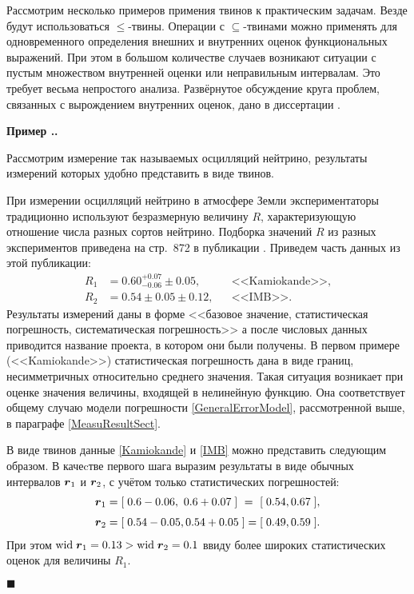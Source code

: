 \documentclass[a5paper,openany]{book}
\newcommand{\mbf}[1]{\protect\text{\boldmath$#1$}}
\newcommand{\w}{\mathrm{wid}\;}
\newcounter{ExmpNum}[section]
\renewcommand{\theExmpNum}{\thesection.\arabic{ExmpNum}}
\newenvironment{example}%
  {\refstepcounter{ExmpNum}%
  \par\addvspace{\medskipamount} 
  \noindent\textbf{Пример {\theExmpNum}.}
  }%
  {\hfill$\blacksquare$\par\medskip}
\begin{document}
Рассмотрим несколько примеров примения твинов к практическим задачам. Везде будут 
использоваться $\leq$-твины. Операции с $\subseteq$-твинами можно применять для 
одновременного определения внешних и внутренних оценок функциональных выражений. 
При этом в большом количестве случаев возникают ситуации с пустым множеством 
внутренней оценки или неправильным интервалам. Это требует весьма непростого анализа. 
Развёрнутое обсуждение круга проблем, связанных с вырождением внутренних оценок, дано 
в  диссертации \cite{Nesterov1999}. 
  
  
\begin{example}
Рассмотрим измерение так называемых осцилляций нейтрино, результаты измерений которых 
удобно представить в виде твинов. 
	
При измерении осцилляций нейтрино в атмосфере Земли экспериментаторы традиционно 
используют безразмерную величину $R$, характеризующую отношение числа разных сортов 
нейтрино. Подборка значений $R$ из разных экспериментов приведена на стр.~872 
в публикации \cite{UFN1997}. Приведем часть данных из этой публикации: 
\begin{align}
R_1 &=  0.60^{+0.07}_{-0.06} \pm 0.05, && \text{<<Kamiokande>>}, \label{Kamiokande}\\[4pt]  
R_2 &=  0.54 \pm 0.05 \pm 0.12, &&   \text{<<IMB>>}. \label{IMB}
\end{align} 
Результаты измерений даны  в форме <<базовое значение, статистическая погрешность, 
систематическая погрешность>> а после числовых данных приводится название проекта, 
в котором они были получены.                                
В первом примере (<<Kamiokande>>) статистическая погрешность дана в виде границ, 
несимметричных относительно среднего значения. Такая ситуация возникает при оценке 
значения величины, входящей в нелинейную функцию. Она соответствует общему случаю 
модели погрешности \eqref{GeneralErrorModel}, рассмотренной выше, 
в параграфе \ref{MeasuResultSect}. 
	
В виде твинов данные \eqref{Kamiokande} и \eqref{IMB} можно представить следующим 
образом. В качеcтве первого шага выразим результаты в виде обычных интервалов $\mbf{r}_1$ 
и $\mbf{r}_2$, с учётом только статистических погрешностей: 
\begin{align}
\mbf{r}_1  &= [\; 0.6-0.06, \  0.6+0.07 \;] \  = \  [\; 0.54, 0.67 \;], \label{r1} \\[3pt]  
\mbf{r}_2  &= [\; 0.54-0.05,  0.54+0.05 \;] = [\; 0.49, 0.59 \;]. \label{r2} 
\end{align}	
При этом $\w{\mbf{r}_1} = 0.13 > \w{\mbf{r}_2} = 0.1$ ввиду более широких статистических 
оценок для величины $R_1$.	
  

\end{example}
\end{document}
